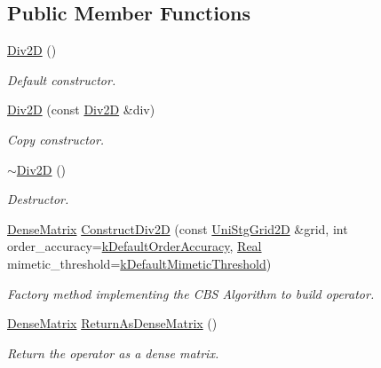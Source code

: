 \subsection*{Public Member Functions}
\begin{DoxyCompactItemize}
\item 
\hyperlink{classmtk_1_1Div2D_a124b888d5889538977e1a47d2fec78ff}{Div2\-D} ()
\begin{DoxyCompactList}\small\item\em Default constructor. \end{DoxyCompactList}\item 
\hyperlink{classmtk_1_1Div2D_a0f5214b5099f17940d6643f39c53332e}{Div2\-D} (const \hyperlink{classmtk_1_1Div2D}{Div2\-D} \&div)
\begin{DoxyCompactList}\small\item\em Copy constructor. \end{DoxyCompactList}\item 
\hyperlink{classmtk_1_1Div2D_a5c10c0d7b974841e923ebe3fda67c468}{$\sim$\-Div2\-D} ()
\begin{DoxyCompactList}\small\item\em Destructor. \end{DoxyCompactList}\item 
\hyperlink{classmtk_1_1DenseMatrix}{Dense\-Matrix} \hyperlink{classmtk_1_1Div2D_a562fa94517362cfbed986dbf6e09921c}{Construct\-Div2\-D} (const \hyperlink{classmtk_1_1UniStgGrid2D}{Uni\-Stg\-Grid2\-D} \&grid, int order\-\_\-accuracy=\hyperlink{group__c01-roots_ga0d95560098eb36420511103637b6952f}{k\-Default\-Order\-Accuracy}, \hyperlink{group__c01-roots_gac080bbbf5cbb5502c9f00405f894857d}{Real} mimetic\-\_\-threshold=\hyperlink{group__c01-roots_ga35718d949bdc81a08a9cc8ebbe3478a2}{k\-Default\-Mimetic\-Threshold})
\begin{DoxyCompactList}\small\item\em Factory method implementing the C\-B\-S Algorithm to build operator. \end{DoxyCompactList}\item 
\hyperlink{classmtk_1_1DenseMatrix}{Dense\-Matrix} \hyperlink{classmtk_1_1Div2D_ae27437bb5ebb5552a786e501e4dcf51e}{Return\-As\-Dense\-Matrix} ()
\begin{DoxyCompactList}\small\item\em Return the operator as a dense matrix. \end{DoxyCompactList}\end{DoxyCompactItemize}
